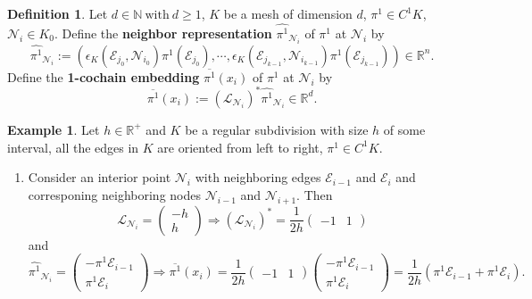 \documentclass[fleqn]{article}
\theoremstyle{definition}
\newtheorem{definition}[theorem]{Definition}
\newtheorem{example}[theorem]{Example}
\newcommand{\N}{\mathbb{N}}
\newcommand{\R}{\mathbb{R}}
\begin{document}
\begin{definition}
  Let $d \in \N\ \text{with}\ d \geq 1$, $K$ be a mesh of dimension $d$,
  $\pi^1 \in C^1 K$, $\mathcal{N}_i \in K_0$.
  Define the \textbf{neighbor representation} $\widehat{\pi^1}_{\mathcal{N}_i}$
  of $\pi^1$ at $\mathcal{N}_i$ by
  \begin{equation}
    \widehat{\pi^1}_{\mathcal{N}_i} :=
    ( \epsilon_K(\mathcal{E}_{j_0}, \mathcal{N}_{i_0}) \pi^1(\mathcal{E}_{j_0}),
      \cdots,
        \epsilon_K(\mathcal{E}_{j_{k - 1}}, \mathcal{N}_{i_{k - 1}})
        \pi^1(\mathcal{E}_{j_{k - 1}})
    ) \in \R^n.
  \end{equation}
  Define the \textbf{1-cochain embedding} $\overline{\pi^1}(x_i)$
  of $\pi^1$ at $\mathcal{N}_i$ by
  \begin{equation}
    \overline{\pi^1}(x_i) :=
    \left(\mathcal{L}_{\mathcal{N}_i}\right)^* \widehat{\pi^1}_{\mathcal{N}_i}
    \in \R^d.
  \end{equation}
\end{definition}

\begin{example}
  Let $h \in \R^+$ and $K$ be a regular subdivision with size $h$
  of some interval,
  all the edges in $K$ are oriented from left to right,
  $\pi^1 \in C^1 K$.
  \begin{enumerate}
    \item
      Consider an interior point $\mathcal{N}_i$ with neighboring edges
      $\mathcal{E}_{i - 1}$ and $\mathcal{E}_i$ and corresponing neighboring
      nodes $\mathcal{N}_{i - 1}$ and $\mathcal{N}_{i + 1}$.
      Then
      \begin{equation}
        \mathcal{L}_{\mathcal{N}_i} =
        \begin{pmatrix}
          -h \\
          h
        \end{pmatrix}
        \Rightarrow
        (\mathcal{L}_{\mathcal{N}_i})^* =
          \frac{1}{2 h}
          \begin{pmatrix}
            -1 & 1
          \end{pmatrix}
      \end{equation}
      and
      \begin{equation}
        \widehat{\pi^1}_{\mathcal{N}_i} =
        \begin{pmatrix}
          - \pi^1 \mathcal{E}_{i - 1} \\
          \pi^1 \mathcal{E}_i
        \end{pmatrix}
        \Rightarrow
        \overline{\pi^1}(x_i) =
          \frac{1}{2 h}
          \begin{pmatrix}
            -1 & 1
          \end{pmatrix}
          \begin{pmatrix}
            - \pi^1 \mathcal{E}_{i - 1} \\
            \pi^1 \mathcal{E}_i
          \end{pmatrix}
        = \frac{1}{2 h}
          \left(\pi^1 \mathcal{E}_{i - 1} + \pi^1 \mathcal{E}_i\right).
      \end{equation}
  \end{enumerate}
\end{example}
\end{document}
